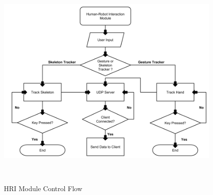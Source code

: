 \begin{figure}
	[h] \centering 
	\includegraphics[height=11cm]{figures/content/hri-flow.png} \caption{HRI Module Control Flow} \label{fg:hri:flow} 
\end{figure}
